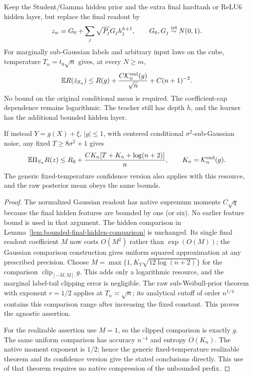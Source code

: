 \begin{corollary}
\label{cor:bounded-final-hidden-gaussian}
Keep the Student/Gamma hidden prior and the extra final hardtanh or
ReLU6 hidden layer, but replace the final readout by
\[
 z_w=G_0+\sum_j\sqrt{P_j}G_jh_j^{h+1},\qquad
 G_0,G_j\stackrel{\rm iid}{\sim}N(0,1).
\]
For marginally sub-Gaussian labels and arbitrary input laws on the
cube, temperature $T_n=t_0\sqrt n$ gives, at every $N\ge m$,
\[
 \mathbb E R(\bar z_{S_n})\le R(g)
        +\frac{C\mathcal K_n^{\rm end}(g)}{\sqrt n}
        +C(n+1)^{-2}.
\]
No bound on the original conditional mean is required.
The coefficient-cap dependence remains logarithmic. The teacher still
has depth $h$, and the learner has the additional bounded hidden layer.

If instead $Y=g(X)+\xi$, $|g|\le1$, with centered conditional
$\sigma^2$-sub-Gaussian noise, any fixed $T\ge8\sigma^2+1$ gives
\[
 \mathbb E\Pi_{S_n}R(z)\le R_0+
   \frac{C K_n[T+K_n+\log(n+2)]}{n},
 \qquad K_n=\mathcal K_n^{\rm end}(g).
\]
The generic fixed-temperature confidence version also applies with
this resource, and the raw posterior mean obeys the same bounds.
\end{corollary}
\begin{proof}
The normalized Gaussian readout has native supremum moments
$C\sqrt q$ because the final hidden features are bounded by one
(or six). No earlier feature bound is used in that argument.
The hidden comparison in
Lemma~\ref{lem:bounded-final-hidden-comparison} is unchanged.
Its single final readout coefficient $M$ now costs $O(M^2)$ rather
than $\exp(O(M))$; the Gaussian comparison construction gives
uniform squared approximation at any prescribed precision.
Choose $M=\max\{1,K_Y\sqrt{12\log(n+2)}\}$ for the comparison
$\operatorname{clip}_{[-M,M]}g$. This adds only a logarithmic
resource, and the marginal label-tail clipping error is negligible.
The raw sub-Weibull-prior theorem with exponent $r=1/2$ applies at
$T_n\asymp\sqrt n$; its analytical cutoff of order $n^{1/4}$
contains this comparison range after increasing the fixed constant.
This proves the agnostic assertion.

For the realizable assertion use $M=1$, so the clipped comparison is
exactly $g$. The same uniform comparison has accuracy $n^{-4}$ and
entropy $O(K_n)$. The native moment exponent is $1/2$; hence the
generic fixed-temperature realizable theorem and its confidence
version give the stated conclusions directly. This use of that
theorem requires no native compression of the unbounded prefix.
\end{proof}

